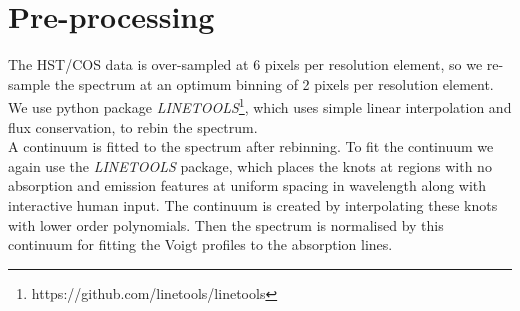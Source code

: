 \section{Pre-processing}


The HST/COS data is over-sampled at 6 pixels per resolution element, so we re-sample the spectrum at an optimum binning of 2 pixels per resolution element. We use python package \emph{LINETOOLS}\footnote{https://github.com/linetools/linetools}, which uses simple linear interpolation and flux conservation, to rebin the spectrum. 
\\
A continuum is fitted to the spectrum after rebinning. To fit the continuum we again use the \emph{LINETOOLS} package, which places the knots at regions with no absorption and emission features at uniform spacing in wavelength along with interactive human input. The continuum is created by interpolating these knots with lower order polynomials. Then the spectrum is normalised by this continuum for fitting the Voigt profiles to the absorption lines.  









